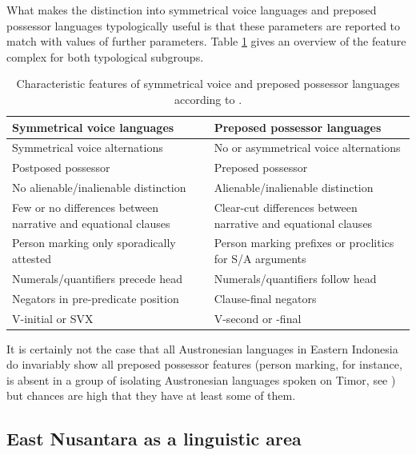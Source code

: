 What makes the distinction into symmetrical voice languages and preposed possessor languages typologically useful is that these parameters are reported to match with values of further parameters. Table \ref{table:sympre} gives an overview of the feature complex for both typological subgroups. 

\begin{table}[ht]
\begin{center}
\begin{footnotesize}
\begin{tabular}{p{6cm} p{6cm}}
\hline\hline
Symmetrical voice languages & Preposed possessor languages \tabularnewline
\hline
Symmetrical voice alternations & No or asymmetrical voice alternations \tabularnewline
Postposed possessor & Preposed possessor \tabularnewline
No alienable/inalienable distinction & Alienable/inalienable distinction \tabularnewline
Few or no differences between narrative and equational clauses & Clear-cut differences between narrative and equational clauses \tabularnewline
Person marking only sporadically attested & Person marking prefixes or proclitics for S/A arguments \tabularnewline
Numerals/quantifiers precede head & Numerals/quantifiers follow head \tabularnewline
Negators in pre-predicate position & Clause-final negators \tabularnewline
V-initial or SVX & V-second or -final \tabularnewline
\hline
\end{tabular}
\caption[Characteristic features of symmetrical voice and preposed possessor languages]{Characteristic features of symmetrical voice and preposed possessor languages according to \citet[175]{Himmelmann2005austronesian}.}
\label{table:sympre}
\end{footnotesize}
\end{center}
\end{table}
\FloatBarrier

It is certainly not the case that all Austronesian languages in Eastern Indonesia do invariably show all preposed possessor features (person marking, for instance, is absent in a group of isolating Austronesian languages spoken on Timor, see \citealt[175]{Himmelmann2005austronesian}) but chances are high that they have at least some of them. 

\subsection{East Nusantara as a linguistic area}\label{sec:nusantara}

